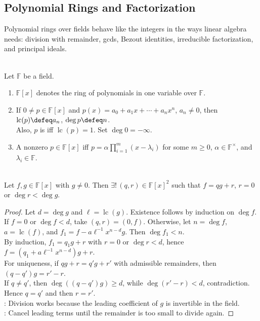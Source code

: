 \subsection{Polynomial Rings and Factorization}

Polynomial rings over fields behave like the integers in the ways linear algebra needs: division with remainder, gcds, Bezout identities, irreducible factorization, and principal ideals.

\begin{definition} \label{def:polynomial-degree-monic-splitting} \\
Let $\mathbb{F}$ be a field.
\begin{enumerate}[label=(\roman*)]
\setlength{\itemsep}{0pt}
\item $\mathbb{F}[x]$ denotes the ring of polynomials in one variable over $\mathbb{F}$.
\item If $0\neq p\in\mathbb{F}[x]$ and $p(x)=a_0+a_1x+\cdots+a_nx^n$, $a_n\neq0$, then $\operatorname{lc}(p)\defeq a_n$, $\deg p\defeq n$.\\
Also, $p$ is  iff $\operatorname{lc}(p)=1$. Set $\deg0=-\infty$.
\item A nonzero $p\in\mathbb{F}[x]$  iff $p=\alpha\prod\limits_{i=1}^{m}(x-\lambda_i)$ for some $m\geq0$, $\alpha\in\mathbb{F}^{\times}$, and $\lambda_i\in\mathbb{F}$.
\end{enumerate}
\end{definition}

\begin{theorem} \label{thm:polynomial-division-algorithm} \\
Let $f,g\in\mathbb{F}[x]$ with $g\neq0$. Then $\exists!\,(q,r)\in\mathbb{F}[x]^2$ such that  $f=qg+r$, $r=0$ or $\deg r<\deg g$.
\begin{proof}
Let $d=\deg g$ and $\ell=\operatorname{lc}(g)$. Existence follows by induction on $\deg f$. If $f=0$ or $\deg f<d$, take $(q,r)=(0,f)$. Otherwise, let $n=\deg f$, $a=\operatorname{lc}(f)$, and $f_1=f-a\ell^{-1}x^{n-d}g$. Then $\deg f_1<n$.\\
By induction, $f_1=q_1g+r$ with $r=0$ or $\deg r<d$, hence $f=(q_1+a\ell^{-1}x^{n-d})g+r$.\\
For uniqueness, if $qg+r=q'g+r'$ with admissible remainders, then $(q-q')g=r'-r$.\\
If $q\neq q'$, then $\deg((q-q')g)\geq d$, while $\deg(r'-r)<d$, contradiction. Hence $q=q'$ and then $r=r'$.\\
: Division works because the leading coefficient of $g$ is invertible in the field.\\
: Cancel leading terms until the remainder is too small to divide again.
\end{proof}
\end{theorem}

